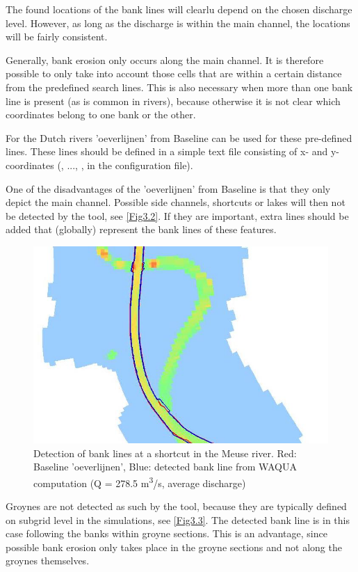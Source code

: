 The found locations of the bank lines will clearlu depend on the chosen discharge level.
However, as long as the discharge is within the main channel, the locations will be fairly consistent.

Generally, bank erosion only occurs along the main channel.
It is therefore possible to only take into account those cells that are within a certain distance from the predefined search lines.
This is also necessary when more than one bank line is present (as is common in rivers), because otherwise it is not clear which coordinates belong to one bank or the other.

For the Dutch rivers 'oeverlijnen' from Baseline can be used for these pre-defined lines.
These lines should be defined in a simple text file consisting of x- and y- coordinates (, ..., , in the configuration file).

One of the disadvantages of the 'oeverlijnen' from Baseline is that they only depict the main channel.
Possible side channels, shortcuts or lakes will then not be detected by the tool, see \autoref{Fig3.2}.
If they are important, extra lines should be added that (globally) represent the bank lines of these features.

\begin{figure}
\includegraphics[width=\textwidth]{figures/Fig3-2.png}
\caption{Detection of bank lines at a shortcut in the Meuse river.
Red: Baseline 'oeverlijnen', Blue: detected bank line from WAQUA computation (Q = 278.5 m\textsuperscript{3}/s, average discharge)}
\label{Fig3.2}
\end{figure}

Groynes are not detected as such by the tool, because they are typically defined on subgrid level in the simulations, see \autoref{Fig3.3}.
The detected bank line is in this case following the banks within groyne sections.
This is an advantage, since possible bank erosion only takes place in the groyne sections and not along the groynes themselves.

